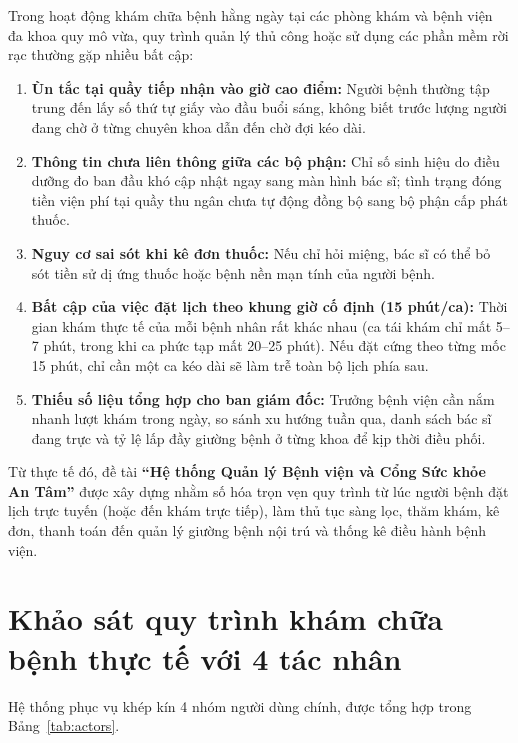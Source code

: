 \documentclass[12pt,a4paper]{report}
\begin{document}
Trong hoạt động khám chữa bệnh hằng ngày tại các phòng khám và bệnh viện đa khoa quy mô vừa, quy trình quản lý thủ công hoặc sử dụng các phần mềm rời rạc thường gặp nhiều bất cập:

\begin{enumerate}
  \item \textbf{Ùn tắc tại quầy tiếp nhận vào giờ cao điểm:} Người bệnh thường tập trung đến lấy số thứ tự giấy vào đầu buổi sáng, không biết trước lượng người đang chờ ở từng chuyên khoa dẫn đến chờ đợi kéo dài.
  \item \textbf{Thông tin chưa liên thông giữa các bộ phận:} Chỉ số sinh hiệu do điều dưỡng đo ban đầu khó cập nhật ngay sang màn hình bác sĩ; tình trạng đóng tiền viện phí tại quầy thu ngân chưa tự động đồng bộ sang bộ phận cấp phát thuốc.
  \item \textbf{Nguy cơ sai sót khi kê đơn thuốc:} Nếu chỉ hỏi miệng, bác sĩ có thể bỏ sót tiền sử dị ứng thuốc hoặc bệnh nền mạn tính của người bệnh.
  \item \textbf{Bất cập của việc đặt lịch theo khung giờ cố định (15 phút/ca):} Thời gian khám thực tế của mỗi bệnh nhân rất khác nhau (ca tái khám chỉ mất 5--7 phút, trong khi ca phức tạp mất 20--25 phút). Nếu đặt cứng theo từng mốc 15 phút, chỉ cần một ca kéo dài sẽ làm trễ toàn bộ lịch phía sau.
  \item \textbf{Thiếu số liệu tổng hợp cho ban giám đốc:} Trưởng bệnh viện cần nắm nhanh lượt khám trong ngày, so sánh xu hướng tuần qua, danh sách bác sĩ đang trực và tỷ lệ lấp đầy giường bệnh ở từng khoa để kịp thời điều phối.
\end{enumerate}

Từ thực tế đó, đề tài \textbf{``Hệ thống Quản lý Bệnh viện và Cổng Sức khỏe An Tâm''} được xây dựng nhằm số hóa trọn vẹn quy trình từ lúc người bệnh đặt lịch trực tuyến (hoặc đến khám trực tiếp), làm thủ tục sàng lọc, thăm khám, kê đơn, thanh toán đến quản lý giường bệnh nội trú và thống kê điều hành bệnh viện.

\section{Khảo sát quy trình khám chữa bệnh thực tế với 4 tác nhân}

Hệ thống phục vụ khép kín 4 nhóm người dùng chính, được tổng hợp trong Bảng~\ref{tab:actors}.
\end{document}
